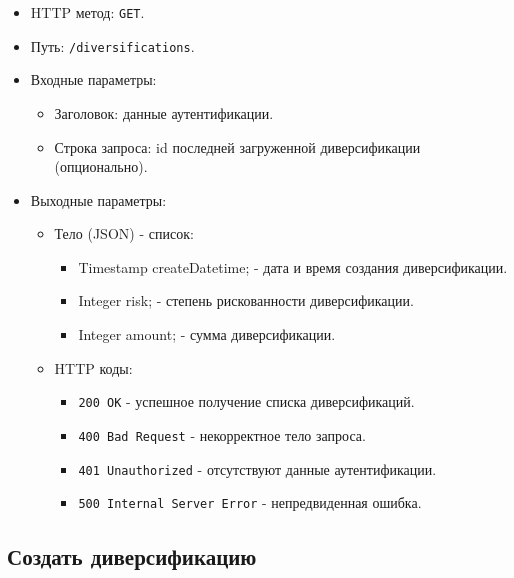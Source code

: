 \documentclass[a4paper, 14pt]{article}
\begin{document}
\begin{itemize}
    \item HTTP метод: \texttt{GET}.
    \item Путь: \texttt{/diversifications}.
    \item Входные параметры:
    \begin{itemize}
        \item Заголовок: данные аутентификации.
        \item Строка запроса: id последней загруженной диверсификации (опционально).
    \end{itemize}
    \item Выходные параметры:
    \begin{itemize}
        \item Тело (JSON) - список:
        \begin{itemize}
            \item Timestamp createDatetime; - дата и время создания диверсификации.
            \item Integer risk; - степень рискованности диверсификации.
            \item Integer amount; - сумма диверсификации.
        \end{itemize}
        \item HTTP коды:
        \begin{itemize}
            \item \texttt{200 OK} - успешное получение списка диверсификаций.
            \item \texttt{400 Bad Request} - некорректное тело запроса.
            \item \texttt{401 Unauthorized} - отсутствуют данные аутентификации.
            \item \texttt{500 Internal Server Error} - непредвиденная ошибка.
        \end{itemize}
    \end{itemize}
\end{itemize}

\subsection{Создать диверсификацию}
\end{document}
